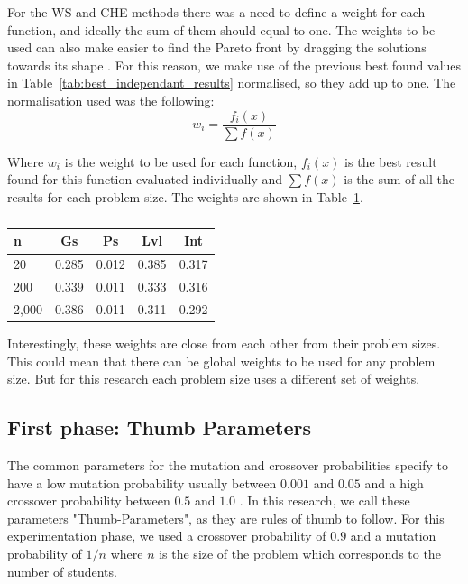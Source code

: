 For the WS and CHE methods there was a need to define a weight for each function, and ideally the sum of them should equal to one. The weights to be used can also make easier to find the Pareto front by dragging the solutions towards its shape \cite{Emmerich2018}. For this reason, we make use of the previous best found values in Table~\ref{tab:best_independant_results} normalised, so they add up to one. The normalisation used was the following:\\

\begin{equation}
    w_i = \frac{f_i(x)}{\sum f(x)}
\end{equation}

Where $w_i$ is the weight to be used for each function, $f_i(x)$ is the best result found for this function evaluated individually and $\sum f(x)$ is the sum of all the results for each problem size. The weights are shown in Table~\ref{tab:weights_to_be_used}.\\

\begin{table}[!htc]
\centering
\begin{tabular}{@{}lcccc@{}}
\toprule
n     & Gs    & Ps    & Lvl   & Int   \\ \midrule
20    & 0.285 & 0.012 & 0.385 & 0.317 \\
200   & 0.339 & 0.011 & 0.333 & 0.316 \\
2,000 & 0.386 & 0.011 & 0.311 & 0.292 \\ \bottomrule
\end{tabular}%
\caption{}
\label{tab:weights_to_be_used}
\end{table}

Interestingly, these weights are close from each other from their problem sizes. This could mean that there can be global weights to be used for any problem size. But for this research each problem size uses a different set of weights.\\

\subsection{First phase: Thumb Parameters}
\label{sec:first-phase}

The common parameters for the mutation and crossover probabilities specify to have a low mutation probability usually between $0.001$ and $0.05$ and a high crossover probability between $0.5$ and $1.0$  \cite{Lin2003}. In this research, we call these parameters "Thumb-Parameters", as they are rules of thumb to follow. For this experimentation phase, we used a crossover probability of $0.9$ and a mutation probability of $1/n$ where $n$ is the size of the problem which corresponds to the number of students. \\


